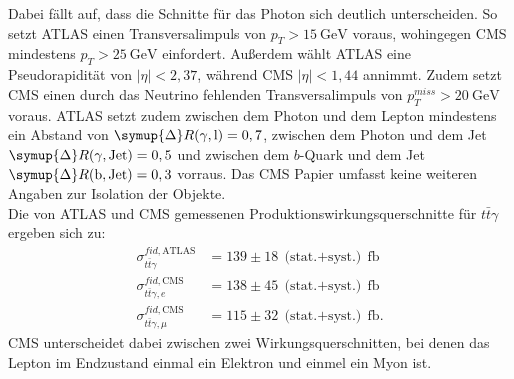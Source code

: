 Dabei fällt auf, dass die Schnitte für das Photon sich deutlich unterscheiden. So setzt ATLAS einen Transversalimpuls von $p_{T} > \SI{15}{\giga\electronvolt}$ voraus, wohingegen CMS mindestens $p_{T} > \SI{25}{\giga\electronvolt}$ einfordert. Außerdem wählt ATLAS eine Pseudorapidität von $|\eta| < 2,37$, während CMS $|\eta| < 1,44$ annimmt. Zudem setzt CMS einen durch das Neutrino fehlenden Transversalimpuls von $p_{T}^{miss} > \SI{20}{\giga\electronvolt}$ voraus.
ATLAS setzt zudem zwischen dem Photon und dem Lepton mindestens ein Abstand von $\symup{\Delta} R(\gamma, \text{l}) = 0,7$, zwischen dem Photon und dem Jet $\symup{\Delta} R(\gamma, \text{Jet}) = 0,5$ und zwischen dem $b$-Quark und dem Jet $\symup{\Delta} R(\text{b}, \text{Jet}) = 0,3$ vorraus.
Das CMS Papier umfasst keine weiteren Angaben zur Isolation der Objekte.\\
Die von ATLAS und CMS gemessenen Produktionswirkungsquerschnitte für $t\bar{t}\gamma$ ergeben sich zu:
\begin{align*}
  \sigma^{fid, \text{ATLAS}}_{t\bar{t}\gamma} &= 139 \pm 18~\text{(stat.$+$syst.)}~ \si{\femto\barn}\\
  \sigma^{fid, \text{CMS}}_{t\bar{t}\gamma, e} &= 138 \pm 45~\text{(stat.$+$syst.)}~ \si{\femto\barn}\\
  \sigma^{fid, \text{CMS}}_{t\bar{t}\gamma, \mu} &= 115 \pm 32~\text{(stat.$+$syst.)}~ \si{\femto\barn}.
\end{align*}
CMS unterscheidet dabei zwischen zwei Wirkungsquerschnitten, bei denen das Lepton im Endzustand einmal ein Elektron und einmel ein Myon ist.

